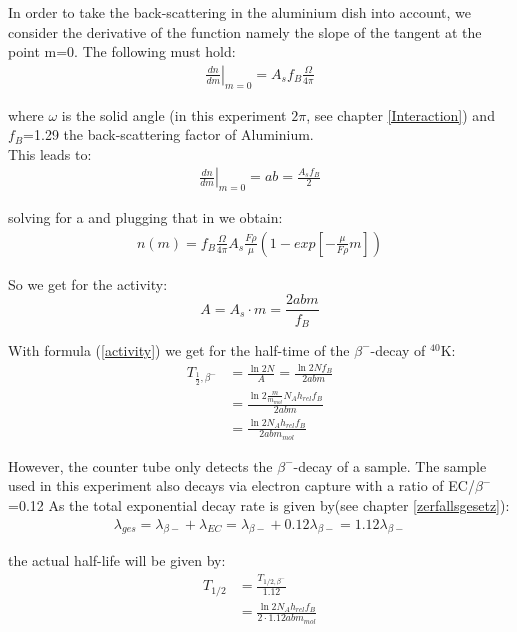 \documentclass[12pt]{article}
\begin{document}
In order to take the back-scattering in the aluminium dish into account, we consider the derivative of the function namely the slope of the tangent at the point m=0. The following must hold: 
\begin{align}
\left. \frac{dn}{dm}\right| _{m=0}=A_s f_B \frac{\Omega}{4\pi}
\end{align}

where $\omega$ is the solid angle (in this experiment $2\pi$, see chapter \ref{Interaction})  and $f_B$=1.29 the back-scattering factor of Aluminium.\\

This leads to:
\begin{align}
\left. \frac{dn}{dm}\right| _{m=0} = ab = \frac{A_s f_B}{2}
\end{align}


solving for a and plugging that in we obtain:
\begin{align}
n(m) = f_B\frac{\Omega}{4\pi}A_s\frac{F\rho}{\mu}\left( 1-exp\left[ -\frac{\mu}{F\rho}m\right] \right) 
\end{align}


So we get for the activity: $$A=A_s\cdot m=\frac{2abm}{f_B}$$

With formula (\ref{activity}) we get for the half-time of the $\beta^-$-decay of $^{40}$K:
\begin{align}
	T_{\frac12,\beta^-}&=\frac{\ln2N}{A}=\frac{\ln2Nf_B}{2abm}\\&=\frac{\ln2\frac{m}{m_{mol}}N_Ah_{rel}f_B}{2abm}\\&=\frac{\ln2N_Ah_{rel}f_B}{2abm_{mol}}
\end{align}

However, the counter tube only detects the $\beta^-$-decay of a sample. The sample used in this experiment also decays via electron capture with a ratio of EC/$\beta^-$=0.12
As the total exponential decay rate is given by(see chapter \ref{zerfallsgesetz}):
\begin{align}
\lambda_{ges} = \lambda_{\beta-} + \lambda_{EC} = \lambda_{\beta-}+0.12\lambda_{\beta-} = 1.12\lambda_{\beta-}
\end{align}

the actual half-life will be given by:
\begin{align}
	T_{1/2} &= \frac{T_{1/2,\beta^-}}{1.12}\\
	&=\frac{\ln2N_Ah_{rel}f_B}{2\cdot1.12abm_{mol}}\label{halftimeKa}
\end{align}

 
\end{document}
